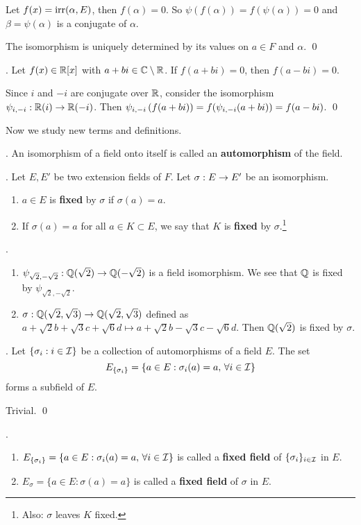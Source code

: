 \pf {} Let \(f(x) = \mathrm{irr}(\alpha, E)\), then \(f(\alpha) = 0\). So \(\psi(f(\alpha)) = f(\psi(\alpha)) = 0\) and \(\beta = \psi(\alpha)\) is a conjugate of \(\alpha\).

 The isomorphism is uniquely determined by its values on \(a \in F\) and \(\alpha\). \qed

\cor. Let \(f(x) \in \mathbb{R}[x]\) with \(a + bi \in \mathbb{C} \setminus \mathbb{R}\). If \(f(a + bi) = 0\), then \(f(a - bi) = 0\).

\pf Since \(i\) and \(-i\) are conjugate over \(\mathbb{R}\), consider the isomorphism \(\psi_{i, -i} : \mathbb{R}(i) \rightarrow \mathbb{R}(-i)\). Then \(\psi_{i, -i}\left( f(a+bi) \right) = f(\psi_{i, -i}(a + bi)) = f(a-bi)\). \qed

Now we study new terms and definitions.

.  An isomorphism of a field onto itself is called an \textbf{automorphism} of the field.

. Let \(E, E'\) be two extension fields of \(F\). Let \(\sigma : E \rightarrow E'\) be an isomorphism.
\begin{enumerate}
    \item \(a \in E\) is \textbf{fixed} by \(\sigma\) if \(\sigma(a) = a\).

    \item If \(\sigma(a) = a\) for all \(a \in K \subset E\), we say that \(K\) is \textbf{fixed} by \(\sigma\).\footnote{Also: \(\sigma\) leaves \(K\) fixed.}
\end{enumerate}

\ex.
\begin{enumerate}
    \item \(\psi_{\sqrt{2}, -\sqrt{2}} : \mathbb{Q}(\sqrt{2}) \rightarrow \mathbb{Q}(-\sqrt{2})\) is a field isomorphism. We see that \(\mathbb{Q}\) is fixed by \(\psi_{\sqrt{2}, -\sqrt{2}}\).
    \item \(\sigma : \mathbb{Q}(\sqrt{2}, \sqrt{3}) \rightarrow \mathbb{Q}(\sqrt{2}, \sqrt{3})\) defined as \(a + \sqrt{2}b + \sqrt{3}c + \sqrt{6}d \mapsto a + \sqrt{2}b - \sqrt{3}c - \sqrt{6}d\). Then \(\mathbb{Q}(\sqrt{2})\) is fixed by \(\sigma\).
\end{enumerate}

\thm. Let \(\{\sigma_i : i \in \mathcal{I}\}\) be a collection of automorphisms of a field \(E\). The set
\[
    E_{\{\sigma_i\}} = \{a \in E : \sigma_i(a) = a,\, \forall i \in \mathcal{I}\}
\]
forms a subfield of \(E\).

\pf Trivial. \qed

. 
\begin{enumerate}
    \item \(E_{\{\sigma_i\}} = \{a \in E : \sigma_i(a) = a,\, \forall i \in \mathcal{I}\}\) is called a \textbf{fixed field} of \(\{\sigma_i\}_{i \in \mathcal{I}}\) in \(E\).
    \item \(E_\sigma = \{a \in E : \sigma(a) = a\}\) is called a \textbf{fixed field} of \(\sigma\) in \(E\).
\end{enumerate}

